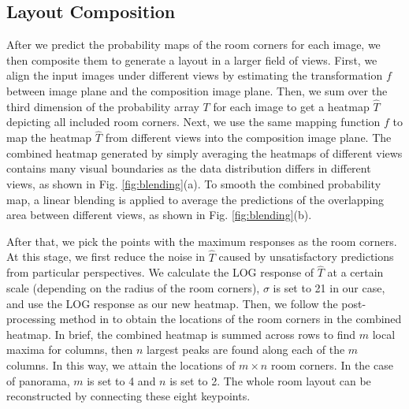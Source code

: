

\subsection{Layout Composition}
\label{sec:merging}
After we predict the probability maps of the room corners for each image, we then composite them to generate a layout in a larger field of views. 
First, we align the input images under different views by estimating the transformation $f$ between image plane and the composition image plane. 
Then, we sum over the third dimension  of the probability array $T$ for each image to get a heatmap $\hat{T}$ depicting all included room corners. 
Next, we use the same mapping function $f$ to map the heatmap $\hat{T}$ from different views into the composition image plane.
%
The combined heatmap generated by simply averaging the heatmaps of different views contains many visual boundaries as the data distribution differs in different views, as shown in Fig. \ref{fig:blending}(a). To smooth the combined probability map, a linear blending  is applied to average the predictions of the overlapping area between different views, as shown in Fig. \ref{fig:blending}(b). 

%
After that, we pick the points with the maximum responses as the room corners. 
At this stage, we first reduce the noise in $\hat{T}$ caused by unsatisfactory predictions from particular perspectives.  
We calculate the LOG response of $\hat{T}$ at a certain scale (depending on the radius of the room corners), $\sigma$ is set to 21 in our case, and use the LOG response as our new heatmap.
%
Then, we follow the post-processing method in \cite{zou2018layoutnet} to obtain the locations of the room corners in the combined heatmap. In brief, the combined heatmap is summed across rows to find $m$ local maxima for columns, then $n$ largest peaks are found along each of the $m$ columns. In this way, we attain the locations of $m \times n$ room corners. In the case of panorama, $m$ is set to 4 and $n$ is set to 2. The whole room layout can be reconstructed by connecting these eight keypoints. 



